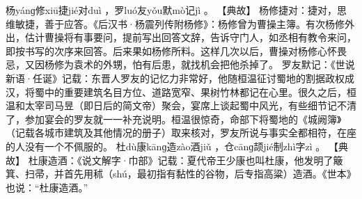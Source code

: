 \documentclass[12pt,UTF8]{ctexbook}
\begin{document}
杨yánɡ修xiū捷jié对duì
，罗luó友yǒu默mò记jì
。
【典故】
杨修捷对：捷对，思维敏捷，善于应答。《后汉书·杨震列传附杨修》：杨修曾为曹操主簿。有次杨修外出，估计曹操将有事要问，提前写出回答文辞，告诉守门人，如丞相有教令来问，即按书写的次序来回答。后来果如杨修所料。这样几次以后，曹操对杨修心怀畏忌，又因杨修为袁术的外甥，怕有后患，就找机会把他杀掉了。
罗友默记：《世说新语·任诞》记载：东晋人罗友的记忆力非常好，他随桓温征讨蜀地的割据政权成汉，将蜀中的重要建筑名目方位、道路宽窄、果树竹林都记在心里。很久之后，桓温和太宰司马昱（即日后的简文帝）聚会，宴席上谈起蜀中风光，有些细节记不清了，参加宴会的罗友就一一补充说明。桓温很惊奇，命部下将蜀地的《城阙簿》（记载各城市建筑及其他情况的册子）取来核对，罗友所说与事实全都相符，在座的人没有一个不佩服的。
杜dù康kānɡ造zào酒jiǔ
，仓cānɡ颉jié制zhì字zì
。
【典故】
杜康造酒：《说文解字·巾部》记载：夏代帝王少康也叫杜康，他发明了簸箕、扫帚，并首先用秫（shú，最初指有黏性的谷物，后专指高粱）造酒。《世本》也说：“杜康造酒。”
\end{document}
